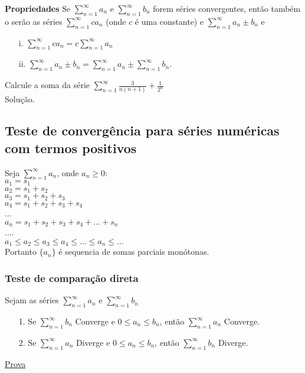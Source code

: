 \textbf{Propriedades} 
Se $\sum_{n=1}^{\infty} a_{n}$ e $\sum_{n=1}^{\infty} b_{n}$ forem séries convergentes, então também o serão as séries $\sum_{n=1}^{\infty} ca_{n}$ (onde $c$ é uma constante) e $\sum_{n=1}^{\infty} a_{n}\pm b_{n}$ e
\begin{itemize}
\item[i.] $\sum_{n=1}^{\infty} ca_{n}=c\sum_{n=1}^{\infty} a_{n}$

\item[ii.] $\sum_{n=1}^{\infty} a_{n}\pm b_{n}=\sum_{n=1}^{\infty} a_{n}\pm \sum_{n=1}^{\infty} b_{n}$.
\end{itemize}

\begin{ex}
	Calcule a soma da série $\sum_{n=1}^{\infty}\frac{3}{n(n+1)}+\frac{1}{2^{n}}$ \\
	Solução.
\end{ex}

\subsection{Teste de convergência para séries numéricas com termos positivos}
Seja $\sum_{n=1}^{\infty}a_{n}$, onde $a_{n}\geq 0$:\\
$a_{1}=s_{1}$\\
$a_{2}=s_{1}+s_{2}$\\
$a_{3}=s_{1}+s_{2}+s_{3}$\\
$a_{4}=s_{1}+s_{2}+s_{3}+s_{4}$\\
...\\
$a_{n}=s_{1}+s_{2}+s_{3}+s_{4}+...+s_{n}$\\
....\\

$a_{1}\leq a_{2}\leq a_{3} \leq a_{4}\leq ...\leq a_{n}\leq...$\\

Portanto $\{a_{n}\}$ é sequencia de somas parciais monótonas.
\subsubsection{Teste de comparação direta}
Sejam as séries $\sum_{n=1}^{\infty}a_{n}$ e $\sum_{n=1}^{\infty}b_{n}$\\
\begin{itemize}
	\item[1.] Se $\sum_{n=1}^{\infty}b_{n}$ Converge e $0\leq a_{n}\leq b_{n}$, então $\sum_{n=1}^{\infty}a_{n}$ Converge.
	
	\item[2.]Se $\sum_{n=1}^{\infty}a_{n}$ Diverge e $0\leq a_{n}\leq b_{n}$, então $\sum_{n=1}^{\infty}b_{n}$ Diverge.
\end{itemize}
\underline{Prova}\\
\vspace*{5cm}

